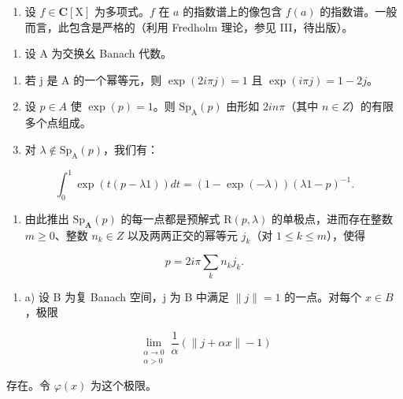 \begin{enumerate}
\def\labelenumi{\alph{enumi})}
\setcounter{enumi}{3}
\tightlist
\item
  设 \(f\in \mathbf{C}[\mathrm{X}]\) 为多项式。\(f\) 在 \(a\) 的指数谱上的像包含 \(f(a)\) 的指数谱。一般而言，此包含是严格的（利用 Fredholm 理论，参见 III，待出版）。
\end{enumerate}

\begin{enumerate}
\def\labelenumi{\arabic{enumi})}
\setcounter{enumi}{5}
\tightlist
\item
  设 A 为交换幺 Banach 代数。
\end{enumerate}

\begin{enumerate}
\def\labelenumi{\alph{enumi})}
\item
  若 j 是 A 的一个幂等元，则 \(\exp(2i\pi j)=1\) 且 \(\exp(i\pi j)=1-2j\)。
\item
  设 \(p \in A\) 使 \(\exp(p) = 1\)。则 \(\mathrm{Sp}_{\mathrm{A}}(p)\) 由形如 \(2in\pi\)（其中 \(n \in Z\)）的有限多个点组成。
\item
  对 \(\lambda \notin \mathrm{Sp}_{\mathrm{A}}(p)\)，我们有：
\end{enumerate}

\[
\int_ {0} ^ {1} \exp (t (p - \lambda 1)) d t = (1 - \exp (- \lambda)) (\lambda 1 - p) ^ {- 1}.
\]

\begin{enumerate}
\def\labelenumi{\alph{enumi})}
\setcounter{enumi}{3}
\tightlist
\item
  由此推出 \(\mathrm{Sp}_{\mathbf{A}}(p)\) 的每一点都是预解式 \(\mathrm{R}(p,\lambda)\) 的单极点，进而存在整数 \(m \geqslant 0\)、整数 \(n_{k} \in Z\) 以及两两正交的幂等元 \(j_{k}\)（对 \(1 \leqslant k \leqslant m\)），使得
\end{enumerate}

\[
p = 2 i \pi \sum_ {k} n _ {k} j _ {k}.
\]

\begin{enumerate}
\def\labelenumi{¶ \arabic{enumi})}
\setcounter{enumi}{6}
\tightlist
\item
  a) 设 B 为复 Banach 空间，j 为 B 中满足 \(\|j\| = 1\) 的一点。对每个 \(x \in B\)，极限
\end{enumerate}

\[
\lim_{\substack{\alpha \to 0\\ \alpha >0}}\frac{1}{\alpha} (\| j + \alpha x\| -1)
\]

存在。令 \(\varphi(x)\) 为这个极限。

